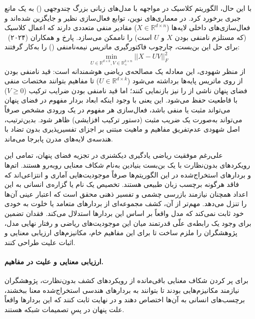 با این حال، الگوریتم کلاسیک  در مواجهه با مدل‌های زبانی بزرگ چندوجهی () به یک مانع جبری برخورد کرد. در معماری‌های نوین، توابع فعال‌سازی نظیر  و  جایگزین  شده‌اند و فعال‌سازی‌های داخلی لایه‌ها ($X \in \mathbb{R}^{d \times n}$) مقادیر منفی متعددی دارند که اعمال  کلاسیک (که مستلزم نامنفی بودن $X$ و $U$ است) را ناممکن می‌سازد. پارخ و همکاران (۲۰۲۴)~\cite{parekh2024conceptbased} برای حل این بن‌بست، چارچوب فاکتورگیری ماتریس نیمه‌نامنفی () را به‌کار گرفتند:
\begin{equation}\label{eq:chap3_semi_nmf}
    \min_{U \in \mathbb{R}^{d \times k}, V \in \mathbb{R}_{+}^{k \times n}} ||X - UV||_F^2
\end{equation}
از منظر شهودی، این معادله یک مصالحه‌ی ریاضی هوشمندانه است: قید نامنفی بودن از روی ماتریس پایه‌ها برداشته می‌شود ($U \in \mathbb{R}^{d \times k}$) تا مفاهیم بتوانند مختصات منفی فضای پنهان ناشی از  را نیز بازنمایی کنند؛ اما قید نامنفی بودن ضرایب ترکیب ($V \ge 0$) با قاطعیت حفظ می‌شود. این یعنی با وجود اینکه ابعاد بردار مفهوم در فضای پنهان می‌تواند مثبت یا منفی باشد، فعال‌سازی هر مفهوم در یک ورودی مشخص صرفاً می‌تواند به‌صورت یک ضریب مثبت (دستور ترکیب افزایشی) ظاهر شود. بدین‌ترتیب، اصل شهودی عدم‌تفریق مفاهیم و ماهیت مبتنی بر اجزای تفسیرپذیری بدون تضاد با هندسه‌ی لایه‌های مدرن پابرجا می‌ماند.

علی‌رغم موفقیت ریاضی یادگیری دیکشنری در تجزیه فضای پنهان، تمامی این رویکردهای بدون‌نظارت با یک بن‌بست بنیادین به‌نام شکاف معنایی روبه‌رو هستند. اتم‌ها و بردارهای استخراج‌شده در این الگوریتم‌ها صرفاً موجودیت‌هایی آماری و انتزاعی‌اند که فاقد هرگونه برچسب زبان طبیعی هستند. تخصیص یک نام یا گزاره‌ی انسانی به این اعداد همچنان نیازمند بازرسی چشمی و تفسیر ذهنی محقق است که اعتبار عینی آن‌ها را تنزل می‌دهد. مهم‌تر از آن، کشف مجموعه‌ای از بردارهای متعامد یا خلوت به خودی خود ثابت نمی‌کند که مدل واقعاً بر اساس این بردارها استدلال می‌کند. فقدان تضمین برای وجود یک رابطه‌ی علّی قدرتمند میان این موجودیت‌های ریاضی و رفتار نهایی مدل، پژوهشگران را ملزم ساخت تا برای این مفاهیم خام، مکانیزم‌های ارزیابی معنایی و اثبات علیت طراحی کنند.

\paragraph{ارزیابی معنایی و علیت در مفاهیم.}

برای پر کردن شکاف معنایی باقی‌مانده از رویکردهای کشف بدون‌نظارت، پژوهشگران نیازمند مکانیزم‌هایی بودند تا بتوانند به بردارهای هندسی استخراج‌شده معنا ببخشند، برچسب‌های انسانی به آن‌ها اختصاص دهند و در نهایت ثابت کنند که این بردارها واقعاً علت پنهان در پسِ تصمیمات شبکه هستند.

